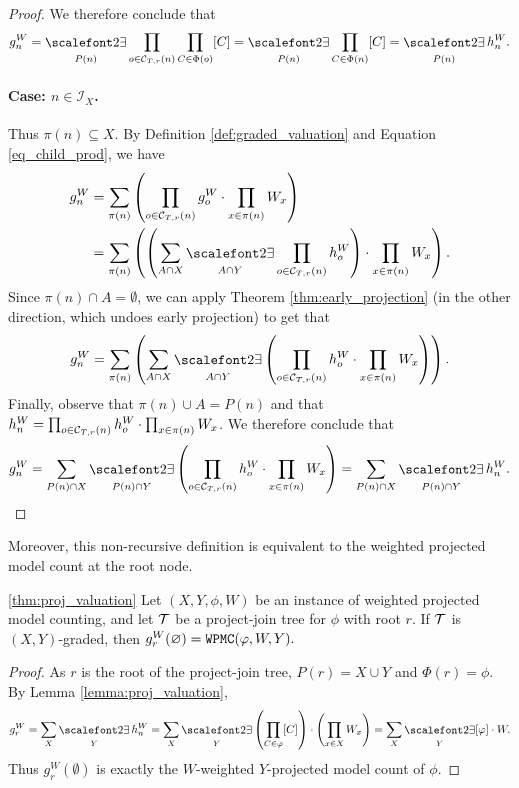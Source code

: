 \begin{proof}
We therefore conclude that $$g^W_n = \displaystyle\exist_{P(n)} \prod_{o \in \C{T}{r}{n}} \prod_{C \in \Phi(o)} [C] = \displaystyle\exist_{P(n)} \prod_{C \in \Phi(n)} [C] = \displaystyle\exist_{P(n)} h^W_n.$$

\paragraph{Case: $n \in \mathcal{I}_X$.} Thus $\pi(n) \subseteq X$. 
By Definition \ref{def:graded_valuation} and Equation \eqref{eq_child_prod}, we have
\begin{align*}
    g^W_n 
    &= \displaystyle\sum_{\pi(n)} \pars{ \prod_{o \in \C T r n} g^W_o \cdot \prod_{x \in \pi(n)} W_x }\\ 
    &= \sum_{\pi(n)} \pars{ \pars{ \sum_{A \cap X} \displaystyle\exist_{A \cap Y} \prod_{o \in \C{T}{r}{n}} h^W_o } \cdot \prod_{x \in \pi(n)} W_x }.
\end{align*}
Since $\pi(n) \cap A = \emptyset$, we can apply Theorem \ref{thm:early_projection} (in the other direction, which undoes early projection) to get that
\begin{equation*}
    g^W_n = \sum_{\pi(n)} \pars{ \sum_{A \cap X} \displaystyle\exist_{A \cap Y} \left( \prod_{o \in \C{T}{r}{n}} h^W_o \cdot \prod_{x \in \pi(n)} W_x \right) }.
\end{equation*}
Finally, observe that $\pi(n) \cup A = P(n)$ and that $h^W_n = \prod_{o \in \mathcal{C}_{T,r}(n)} h^W_o \cdot \prod_{x \in \pi(n)} W_x$. We therefore conclude that
\begin{equation*}
    g^W_n = \sum_{P(n) \cap X} \displaystyle\exist_{P(n) \cap Y} \left( \prod_{o \in \C{T}{r}{n}} h^W_o \cdot \prod_{x \in \pi(n)} W_x \right) =  \sum_{P(n) \cap X} \displaystyle\exist_{P(n) \cap Y} h^W_n.
\end{equation*}
\end{proof}

Moreover, this non-recursive definition is equivalent to the weighted projected model count at the root node.
\begin{theorem}{\ref{thm:proj_valuation}}
Let $(X, Y, \phi, W)$ be an instance of weighted projected model counting, and let $\mathcal{T}$ be a project-join tree for $\phi$ with root $r$. 
If $\mathcal{T}$ is $(X, Y)$-graded, then $g^W_r(\varnothing) = \texttt{\upshape WPMC}(\varphi, W, Y).$
\end{theorem}
\begin{proof}
As $r$ is the root of the project-join tree, $P(r) = X \cup Y$ and $\Phi(r) = \phi$. By Lemma \ref{lemma:proj_valuation}, $$g^W_r = \sum_{X} \displaystyle\exist_{Y} h^W_n = \sum_{X} \displaystyle\exist_{Y} \left( \prod_{C \in \phi} [C] \right) \mult \left( \prod_{x \in X} W_x \right) = \sum_{X} \displaystyle\exist_{Y} [\phi] \mult W.$$
Thus $g^W_r(\emptyset)$ is exactly the $W$-weighted $Y$-projected model count of $\phi$.
\end{proof}
